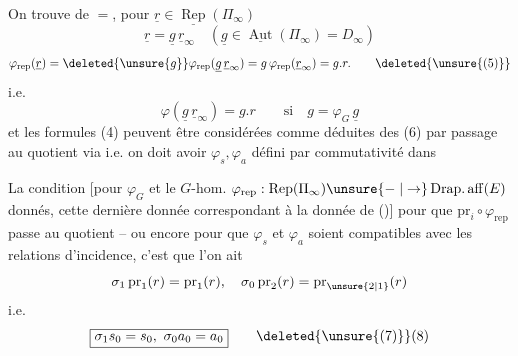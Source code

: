 On trouve de $=$, pour $\underline r\in\underline{\operatorname{Rep}}(\Pi_\infty)$
\[ \underline r=\underline g\,\underline r_\infty\quad(\underline g\in\underline{\operatorname{Aut}}(\Pi_\infty)=D_\infty) \]
\[ \varphi_{\mathrm{rep}}(\underline r)=\deleted{\unsure{g}}\varphi_{\mathrm{rep}}(\underline g\,\underline r_\infty)=g\,\varphi_{\mathrm{rep}}(\underline r_\infty)=g.r. \tag*{\deleted{\unsure{(5)}}} \]
i.e.
\[ \varphi(\underline g\,\underline r_\infty)=g.r\qquad\text{si}\quad g=\varphi_G\,\underline g \tag*{(6)} \]
et les formules (4)  peuvent être
considérées comme déduites des  (6)
par passage au quotient via
i.e. on doit avoir $\varphi_s,\varphi_a$ défini par
commutativité dans

La condition [pour $\varphi_G$  et le $G$-hom.
$\varphi_{\mathrm{rep}}:\operatorname{Rep}(\Pi_\infty)\unsure{\relbar|\to}\operatorname{Drap.aff}(E)$ donnés, cette
dernière donnée correspondant à la donnée
de ()] pour que $\mathrm{pr}_i\circ\varphi_{\mathrm{rep}}$ passe au quotient 
-- ou encore pour que $\varphi_s$ et $\varphi_a$ soient
compatibles avec les relations d'incidence,
c'est que l'on ait
\[ \sigma_1\,\mathrm{pr}_1(r)=\mathrm{pr}_1(r),\quad \sigma_0\,\mathrm{pr}_2(r)=\mathrm{pr}_{\unsure{2|1}}(r) \]
i.e.
\[ \boxed{\sigma_1s_0=s_0,\ \sigma_0a_0=a_0} \tag*{\deleted{\unsure{(7)}}(8)} \]


